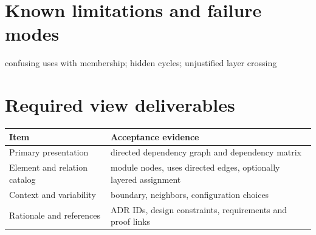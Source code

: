 \documentclass[10pt,letterpaper]{article}
\begin{document}
\section{Known limitations and failure modes}
confusing uses with membership; hidden cycles; unjustified layer crossing

\section{Required view deliverables}
\small
\begin{tabularx}{\linewidth}{@{}YY@{}}
\toprule
\textbf{Item} & \textbf{Acceptance evidence} \\
\midrule
Primary presentation & directed dependency graph and dependency matrix \\
Element and relation catalog & module nodes, uses directed edges, optionally layered assignment \\
Context and variability & boundary, neighbors, configuration choices \\
Rationale and references & ADR IDs, design constraints, requirements and proof links \\
\bottomrule
\end{tabularx}
\normalsize
\end{document}
